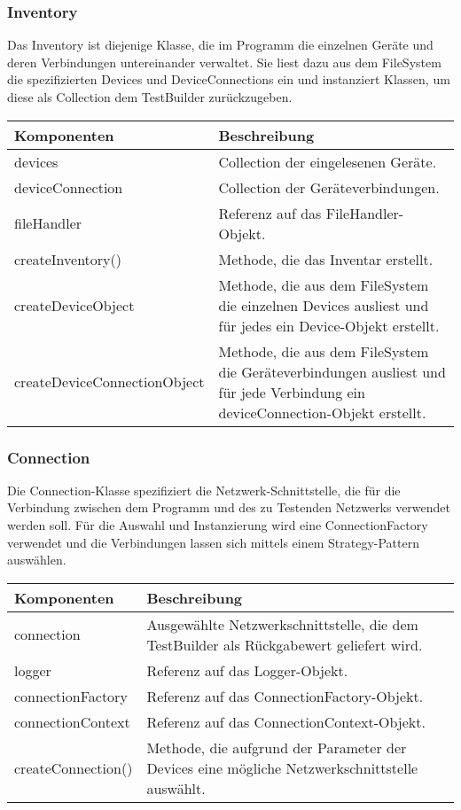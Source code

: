 \documentclass[
	ngerman,
	toc=listof, %
	toc=bibliography, %
	footnotes=multiple, %
	parskip=half, %
	numbers=noendperiod %
]{scrartcl}
\begin{document}
	\subsubsection{Inventory}
	Das Inventory ist diejenige Klasse, die im Programm die einzelnen Geräte und deren Verbindungen untereinander verwaltet. 
	Sie liest dazu aus dem FileSystem die spezifizierten Devices und DeviceConnections ein und instanziert Klassen, um diese als Collection dem TestBuilder zurückzugeben.

	\begin{tabularx}{\textwidth}{lX}
		\toprule
			Komponenten & Beschreibung \\
		\midrule
			devices & Collection der eingelesenen Geräte.\\
			deviceConnection & Collection der Geräteverbindungen. \\
			fileHandler & Referenz auf das FileHandler-Objekt.\\
		\midrule
			createInventory() & Methode, die das Inventar erstellt. \\
			createDeviceObject & Methode, die aus dem FileSystem die einzelnen Devices ausliest und für jedes ein Device-Objekt erstellt. \\
			createDeviceConnectionObject & Methode, die aus dem FileSystem die Geräteverbindungen ausliest und für jede Verbindung ein deviceConnection-Objekt erstellt.\\
		\bottomrule
	\end{tabularx}
	\newpage

	\subsubsection{Connection}
	Die Connection-Klasse spezifiziert die Netzwerk-Schnittstelle, die für die Verbindung zwischen dem Programm und des zu Testenden Netzwerks verwendet werden soll.
	Für die Auswahl und Instanzierung wird eine ConnectionFactory verwendet und die Verbindungen lassen sich mittels einem Strategy-Pattern auswählen.

	\begin{tabularx}{\textwidth}{lX}
		\toprule
			Komponenten & Beschreibung \\
		\midrule
			connection & Ausgewählte Netzwerkschnittstelle, die dem TestBuilder als Rückgabewert geliefert wird. \\
			logger & Referenz auf das Logger-Objekt. \\
			connectionFactory & Referenz auf das ConnectionFactory-Objekt. \\
			connectionContext & Referenz auf das ConnectionContext-Objekt. \\
		\midrule
			createConnection() & Methode, die aufgrund der Parameter der Devices eine mögliche Netzwerkschnittstelle auswählt.\\
		\bottomrule
	\end{tabularx}
\end{document}
